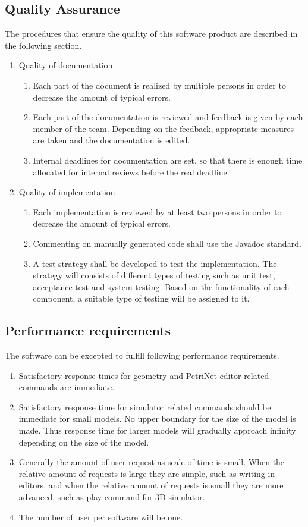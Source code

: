 \subsection{Quality Assurance}
The procedures that ensure the quality of this software product are described in the following section.
\begin{enumerate}
	\item Quality of documentation
	\begin{enumerate}
		\item Each part of the document is realized by multiple persons in order to decrease the amount of typical errors.
		\item Each part of the documentation is reviewed and feedback is given by each member of the team. Depending on the feedback, appropriate measures are taken and the documentation is edited.
		\item Internal deadlines for documentation are set, so that there is enough time allocated for internal reviews before the real deadline.
	\end{enumerate}
	\item Quality of implementation
	\begin{enumerate}
		\item Each implementation is reviewed by at least two persons in order to decrease the amount of typical errors.
		\item Commenting on manually generated code shall use the Javadoc standard.
		\item A test strategy shall be developed to test the implementation. The strategy will consists of different types of testing such as unit test, acceptance test and system testing. Based on the functionality of each component, a suitable type of testing will be assigned to it. 
	\end{enumerate}
\end{enumerate}

\subsection{Performance requirements}
The software can be excepted to fulfill following performance requirements.
\begin{enumerate}
	\item Satisfactory response times for geometry and PetriNet editor related commands are immediate.
	\item Satisfactory response time for simulator related commands should be immediate for small models. No upper boundary for the size of the model is made. Thus response time for larger models will gradually approach infinity depending on the size of the model.
	\item Generally the amount of user request as scale of time is small. When the relative amount of requests is large they are simple, such as writing in editors, and when the relative amount of requests is small they are more advanced, such as play command for 3D simulator.
	\item The number of user per software will be one.
\end{enumerate}

